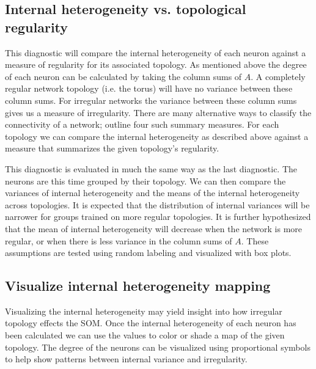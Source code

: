 \subsection{Internal heterogeneity vs. topological regularity}
This diagnostic will compare the internal heterogeneity of each neuron against a
measure of regularity for its associated topology.  As mentioned above the
degree of each neuron can be calculated by taking the column sums of $A$.  A
completely regular network topology (i.e. the torus) will have no variance
between these column sums.  For irregular networks the variance between these
column sums gives us a measure of irregularity. There are many alternative
ways to classify the connectivity of a network; \cite{florax95} outline four
such summary measures.  For each topology we can compare the internal
heterogeneity as described above against a measure that summarizes the given
topology's regularity.

This diagnostic is evaluated in much the same way as the last diagnostic.  
The neurons are this time grouped by their topology.  We can then
compare the variances of internal heterogeneity and the means of the internal
heterogeneity across topologies.  It is expected that the distribution of internal
variances will be narrower for groups trained on more regular topologies.
It is further hypothesized that the mean of internal heterogeneity will
decrease when the network is more regular, or when there is less variance in
the column sums of $A$.  These assumptions are tested using random labeling
and visualized with box plots.

\subsection{Visualize internal heterogeneity mapping}
Visualizing the internal heterogeneity may yield insight into how irregular topology
effects the SOM.  Once the internal heterogeneity of each neuron has been calculated
we can use the values to color or shade a map of the given topology.  
The degree of the neurons can be visualized using proportional symbols to help show patterns between internal variance and irregularity.

